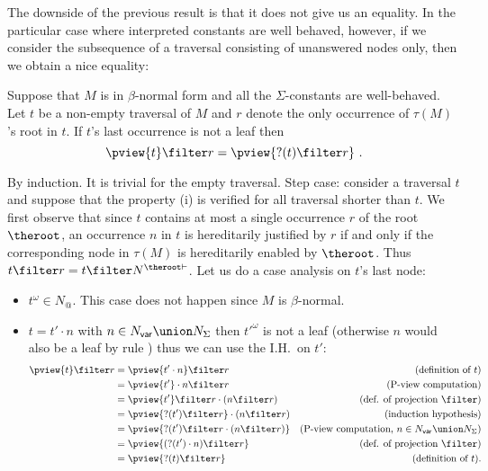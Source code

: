 The downside of the previous result is that it does not give us an
equality. In the particular case where interpreted constants are
well behaved, however, if we consider the subsequence of a traversal consisting of unanswered nodes only, then we obtain a nice equality:
\begin{lemma}
\label{lem:betanf_wellbehavedconst_trav_pview_red} Suppose that $M$
is in $\beta$-normal form and all the $\Sigma$-constants are
well-behaved. Let $t$ be a non-empty traversal of $M$ and $r$ denote
the only occurrence of $\tau(M)$'s root in $t$. If $t$'s last
occurrence is not a leaf then
$$ \pview{t} \filter r = \pview{?(t) \filter  r }\ .$$
\end{lemma}
\proof By induction. It is trivial for the empty traversal. Step
case: consider a traversal $t$ and suppose that the property (i) is
verified for all traversal shorter than $t$. We first observe that
since $t$ contains at most a single occurrence $r$ of the root
$\theroot$, an occurrence $n$ in $t$ is hereditarily justified by
$r$ if and only if the corresponding node in $\tau(M)$ is
hereditarily enabled by $\theroot$. Thus $t\filter r = t \filter
N^{\theroot \vdash}$. Let us do a case analysis on $t$'s last node:
\begin{itemize}
\item $t^\omega \in N_@$. This case does not happen since $M$ is $\beta$-normal.

\item $t = t' \cdot n$ with $n \in N_{\sf var} \union N_\Sigma$ then $t'^\omega$ is not a leaf (otherwise $n$ would also be a leaf by rule ) thus we can use the I.H.\ on $t'$:
    \begin{align*}
    \pview{t} \filter  r
        &= \pview{t' \cdot n} \filter  r & (\mbox{definition of } t)\\
        &= \pview{t'} \cdot n \filter  r  & (\mbox{P-view computation}) \\
        &= \pview{t'} \filter  r  \cdot (n \filter  r)            & (\mbox{def. of projection $\filter$}) \\
        &= \pview{?(t') \filter r} \cdot (n \filter  r)           & (\mbox{induction hypothesis}) \\
        &= \pview{?(t') \filter  r \cdot (n \filter  r) } & (\mbox{P-view computation, $n \in N_{\sf var} \union N_{\Sigma}$}) \\
        &= \pview{(?(t') \cdot n ) \filter  r }           & (\mbox{def. of projection $\filter$}) \\
        &= \pview{?(t) \filter  r  }
 & (\mbox{definition of } t).
    \end{align*}
\end{itemize}
